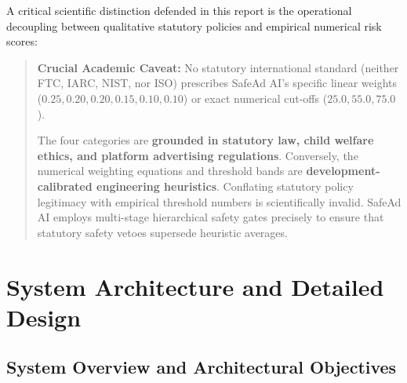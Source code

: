 \documentclass[12pt,a4paper]{report}
\begin{document}
A critical scientific distinction defended in this report is the operational decoupling between qualitative statutory policies and empirical numerical risk scores:
\begin{quote}
\textbf{Crucial Academic Caveat:} No statutory international standard (neither FTC, IARC, NIST, nor ISO) prescribes SafeAd AI's specific linear weights ($0.25, 0.20, 0.20, 0.15, 0.10, 0.10$) or exact numerical cut-offs ($25.0, 55.0, 75.0$). 

The four categories are \textbf{grounded in statutory law, child welfare ethics, and platform advertising regulations}. Conversely, the numerical weighting equations and threshold bands are \textbf{development-calibrated engineering heuristics}. Conflating statutory policy legitimacy with empirical threshold numbers is scientifically invalid. SafeAd AI employs multi-stage hierarchical safety gates precisely to ensure that statutory safety vetoes supersede heuristic averages.
\end{quote}




\chapter{System Architecture and Detailed Design}

\section{System Overview and Architectural Objectives}
\end{document}
